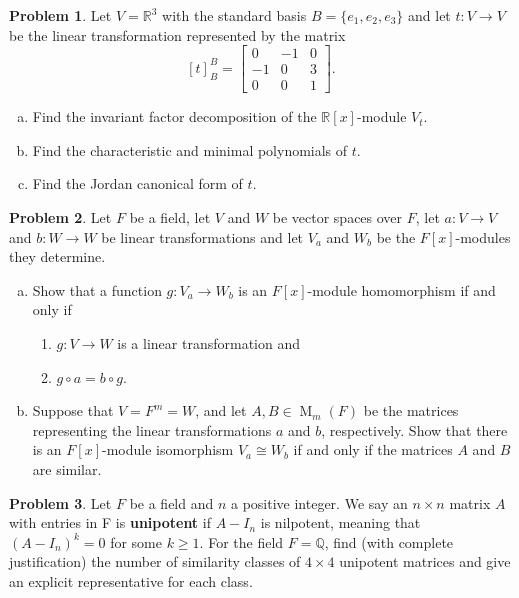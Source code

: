 \documentclass[11pt]{article}
\DeclareMathOperator{\M}{M}
\newcommand{\Q}{\mathbb{Q}}
\newcommand{\R}{\mathbb{R}}
\theoremstyle{definition}
\newtheorem{problem}{Problem}
\begin{document}
\begin{problem}
Let $V = \R^3$ with the standard basis $B=\{e_1,e_2,e_3\}$ and let $t: V \to V$ be the linear transformation represented by the matrix 
$$[t]_B^B =
\begin{bmatrix}
0	&	-1	&	0\\
-1	&	0	&	3\\	
0	&	0	&	1	
\end{bmatrix}.$$ 

\begin{enumerate}[a)]
\item Find the invariant factor decomposition of the $\R[x]$-module $V_t$. 
\item Find the characteristic and minimal polynomials of $t$.
\item Find the Jordan canonical form of $t$.
\end{enumerate}	
\end{problem}


\vfill


\begin{problem}
Let $F$ be a field, let $V$ and $W$ be vector spaces over $F$, let $a\!: V \to V$ and $b\!:W \to W$ be linear transformations and let $V_a$ and $W_b$ be the $F[x]$-modules they determine. 
\begin{enumerate}[a)]
\item Show that a function $g: V_a \to W_b$ is an $F[x]$-module homomorphism if and only if 
\begin{enumerate}[(1)]
\item $g: V \to W$ is a linear transformation and 
\item $g \circ a = b \circ g$.
\end{enumerate} 
\item Suppose that $V = F^m = W$, and let $A, B \in \M_m(F)$ be the matrices representing the linear transformations $a$ and $b$, respectively. Show that there is an $F[x]$-module isomorphism $V_a \cong W_b$ if and only if the matrices $A$ and $B$ are similar.
\end{enumerate}
\end{problem}

\vfill

\begin{problem}
Let $F$ be a field and $n$ a positive integer. We say an $n \times n$ matrix $A$ with entries in F is {\bf unipotent} if $A-I_n$ is nilpotent, meaning that $(A-I_n)^k = 0$ for some $k \geqslant 1$. For the field $F = \Q$, find (with complete justification) the number of similarity classes of $4 \times 4$ unipotent matrices and give an explicit representative for each class.
\end{problem}
\end{document}
